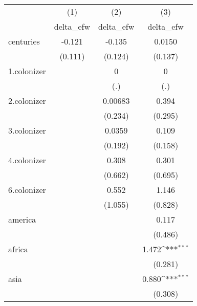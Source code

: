 {
\def\sym#1{\ifmmode^{#1}\else\(^{#1}\)\fi}
\begin{tabular}{l*{3}{c}}
\hline\hline
            &\multicolumn{1}{c}{(1)}&\multicolumn{1}{c}{(2)}&\multicolumn{1}{c}{(3)}\\
            &\multicolumn{1}{c}{delta\_efw}&\multicolumn{1}{c}{delta\_efw}&\multicolumn{1}{c}{delta\_efw}\\
\hline
centuries   &      -0.121         &      -0.135         &      0.0150         \\
            &     (0.111)         &     (0.124)         &     (0.137)         \\
[1em]
1.colonizer &                     &           0         &           0         \\
            &                     &         (.)         &         (.)         \\
[1em]
2.colonizer &                     &     0.00683         &       0.394         \\
            &                     &     (0.234)         &     (0.295)         \\
[1em]
3.colonizer &                     &      0.0359         &       0.109         \\
            &                     &     (0.192)         &     (0.158)         \\
[1em]
4.colonizer &                     &       0.308         &       0.301         \\
            &                     &     (0.662)         &     (0.695)         \\
[1em]
6.colonizer &                     &       0.552         &       1.146         \\
            &                     &     (1.055)         &     (0.828)         \\
[1em]
america     &                     &                     &       0.117         \\
            &                     &                     &     (0.486)         \\
[1em]
africa      &                     &                     &       1.472\sym{***}\\
            &                     &                     &     (0.281)         \\
[1em]
asia        &                     &                     &       0.880\sym{***}\\
            &                     &                     &     (0.308)         \\

\end{tabular}}
